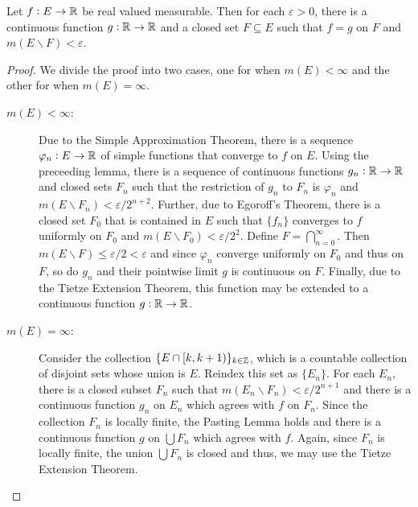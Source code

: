 \begin{theorem}[Lusin]
    Let $f: E\to\mathbb{R}$ be real valued measurable. Then for each $\varepsilon > 0$, there is a continuous function $g:\mathbb{R}\to\mathbb{R}$ and a closed set $F\subseteq E$ such that $f = g$ on $F$ and $m(E\backslash F) < \varepsilon$.
\end{theorem}
\begin{proof}
We divide the proof into two cases, one for when $m(E) < \infty$ and the other for when $m(E) = \infty$.
\begin{description}
\item[\underline{$m(E) < \infty$}: ] Due to the Simple Approximation Theorem, there is a sequence $\varphi_n: E\to\mathbb{R}$ of simple functions that converge to $f$ on $E$. Using the preceeding lemma, there is a sequence of continuous functions $g_n: \mathbb{R}\to\mathbb{R}$ and closed sets $F_n$ such that the restriction of $g_n$ to $F_n$ is $\varphi_n$ and $m(E\backslash F_n) < \varepsilon/2^{n + 2}$. Further, due to Egoroff's Theorem, there is a closed set $F_0$ that is contained in $E$ such that $\{f_n\}$ converges to $f$ uniformly on $F_0$ and $m(E\backslash F_0) < \varepsilon/2^2$. Define $F = \bigcap\limits_{n = 0}^\infty$. Then $m(E\backslash F)\le\varepsilon/2 < \varepsilon$ and since $\varphi_n$ converge uniformly on $F_0$ and thus on $F$, so do $g_n$ and their pointwise limit $g$ is continuous on $F$. Finally, due to the Tietze Extension Theorem, this function may be extended to a continuous function $g:\mathbb{R}\to\mathbb{R}$.

\item[\underline{$m(E) = \infty$}: ] Consider the collection $\{E\cap[k,k + 1)\}_{k\in\mathbb{Z}}$, which is a countable collection of disjoint sets whose union is $E$. Reindex this set as $\{E_n\}$. For each $E_n$, there is a closed subset $F_n$ such that $m(E_n\backslash F_n) < \varepsilon/2^{n + 1}$ and there is a continuous function $g_n$ on $E_n$ which agrees with $f$ on $F_n$. Since the collection $F_n$ is locally finite, the Pasting Lemma holds and there is a continuous function $g$ on $\bigcup F_n$ which agrees with $f$. Again, since $F_n$ is locally finite, the union $\bigcup F_n$ is closed and thus, we may use the Tietze Extension Theorem.
\end{description}
\end{proof}
